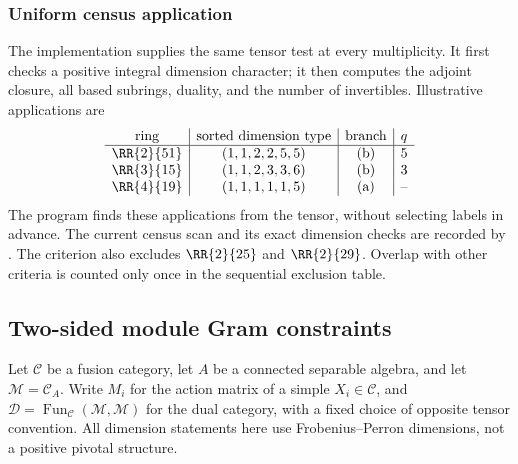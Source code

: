 \subsubsection{Uniform census application}
The implementation supplies the same tensor test at every multiplicity.
It first checks a positive integral dimension character; it then
computes the adjoint closure, all based subrings, duality, and the number
of invertibles. Illustrative applications are
\[
\begin{array}{c|c|c|c}
 \text{ring}&\text{sorted dimension type}&\text{branch}&q\\\hline
 \RR{2}{51}&(1,1,2,2,5,5)&\text{(b)}&5\\
 \RR{3}{15}&(1,1,2,3,3,6)&\text{(b)}&3\\
 \RR{4}{19}&(1,1,1,1,1,5)&\text{(a)}&\text{--}
\end{array}
\]
The program finds these applications from the tensor, without selecting
labels in advance. The current census scan and its exact dimension
checks are recorded by .
The criterion also excludes $\RR{2}{25}$ and $\RR{2}{29}$.
Overlap with other criteria is counted only once in the sequential
exclusion table.

\subsection{Two-sided module Gram constraints}\label{sec:dual-module-gram}
Let $\mathcal C$ be a fusion category, let $A$ be a connected separable algebra,
and let $\mathcal M=\mathcal C_A$. Write $M_i$ for the action matrix of a
simple $X_i\in\mathcal C$, and $\mathcal D=\operatorname{Fun}_{\mathcal C}
(\mathcal M,\mathcal M)$ for the dual category, with a fixed choice of
opposite tensor convention. All dimension statements here use
Frobenius--Perron dimensions, not a positive pivotal structure.

